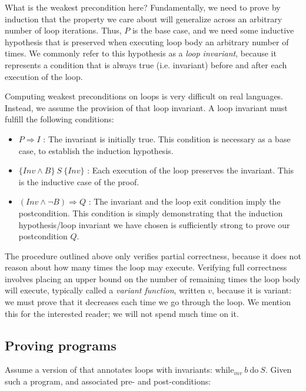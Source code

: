 \documentclass[11pt]{article}
\begin{document}
What is the weakest precondition here?  Fundamentally, we
need to prove by induction that the property we care about will generalize
across an arbitrary number of loop iterations.  Thus, $P$ is the base case,
and we need some inductive hypothesis that is preserved when executing loop body
an arbitrary number of times. We commonly refer to this hypothesis as a \textit{loop
  invariant}, because it represents a condition that is always true
(i.e. invariant) before and after each execution of the loop.

Computing weakest preconditions on loops is very difficult on real languages.
Instead, we assume the provision of that loop invariant.  A loop invariant must
fulfill the following conditions:

\begin{itemize}
\item $P \Rightarrow I$ : The invariant is initially true.  This condition is
  necessary as a base case, to establish the induction hypothesis.

\item $\{ Inv \land B \} ~S~ \{Inv\}$ : Each execution of the loop preserves the
  invariant.  This is the inductive case of the proof.

\item $(Inv \land \lnot B) \Rightarrow Q$ : The invariant and the loop exit
  condition imply the postcondition.  This condition is simply demonstrating
  that the induction hypothesis/loop invariant we have chosen is sufficiently
  strong to prove our postcondition $Q$.
\end{itemize}

The procedure outlined above only verifies partial correctness, because it does
not reason about how many times the loop may execute.  Verifying full
correctness involves placing an upper bound on the number of remaining times the
loop body will execute, typically called a \textit{variant function}, written
$v$, because it is variant: we must prove that it decreases each time we go
through the loop.  We mention this for the interested reader; we will not spend
much time on it.

\subsection{Proving programs}

Assume a version of \WhileLang that annotates loops with invariants:
$\mbox{while}_{inv}~b~\mbox{do}~S$.
%
Given such a program, and associated pre- and post-conditions:
\end{document}
